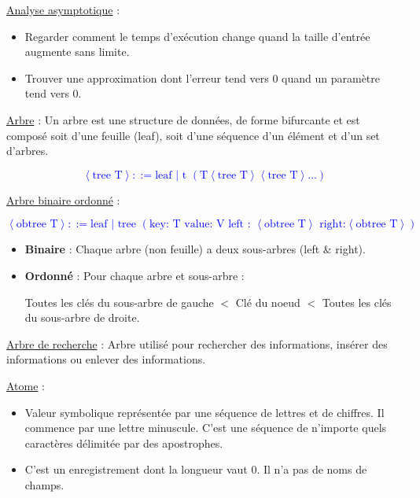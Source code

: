 \documentclass[fr,license=none,skiptoc]{../../../eplsummary}
\begin{document}
\begin{flushleft}
\textcolor{mauvedef}{\underline{Analyse asymptotique}} : 

\begin{itemize}
\item Regarder comment le temps d'exécution change quand la taille d'entrée augmente sans limite.
\item Trouver une approximation dont l'erreur tend vers 0 quand un paramètre tend vers 0.
\end{itemize} \bigbreak


\textcolor{mauvedef}{\underline{Arbre}} : Un arbre est une structure de données, de forme bifurcante et est composé soit d'une feuille (leaf), soit d'une séquence d'un élément et d'un set d'arbres.


\textcolor{blue}{$$\left\langle \text{tree T} \right\rangle ::= \text{leaf | t }(\text{T} \left\langle \text{tree T} \right\rangle   \left\langle \text{tree T} \right\rangle \ldots )$$} 


\textcolor{mauvedef}{\underline{Arbre binaire ordonné}} : 

\textcolor{blue}{$$\left\langle \text{obtree T} \right\rangle ::= \text{leaf | tree }(\text{key: T   value: V  left : } \left\langle  \text{obtree T} \right\rangle  \text{ right:} \left\langle \text{obtree T} \right\rangle )$$} 

\begin{itemize}
\item \textbf{Binaire} : Chaque arbre (non feuille) a deux sous-arbres (left \& right).
\item \textbf{Ordonné} : Pour chaque arbre et sous-arbre :

Toutes les clés du sous-arbre de gauche $<$ Clé du noeud $<$ Toutes les clés du sous-arbre de droite.
\end{itemize} \bigbreak


\textcolor{mauvedef}{\underline{Arbre de recherche}} : Arbre utilisé pour rechercher des informations, insérer des informations ou enlever des informations. \bigbreak

\textcolor{mauvedef}{\underline{Atome}} :

\begin{itemize}
\item Valeur symbolique représentée par une séquence de lettres et de chiffres. Il commence par une lettre minuscule. C'est une séquence de n'importe quels caractères délimitée par des apostrophes.
\item C'est un enregistrement dont la longueur vaut 0. Il n'a pas de noms de champs.
\end{itemize} \bigbreak



\end{flushleft}
\end{document}
